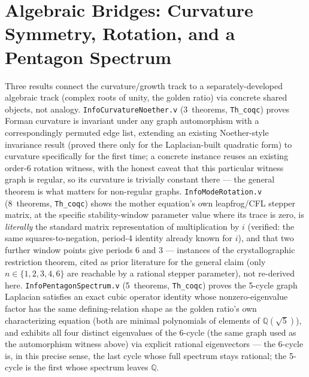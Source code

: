 \documentclass[10pt,twocolumn]{article}
\begin{document}
\section{Algebraic Bridges: Curvature Symmetry, Rotation, and a Pentagon Spectrum}
\label{sec:algebra}
Three results connect the curvature/growth track to a separately-developed
algebraic track (complex roots of unity, the golden ratio) via concrete
shared objects, not analogy. \texttt{InfoCurvatureNoether.v}
(3~theorems, \texttt{Th\_coqc}) proves Forman curvature is invariant under
any graph automorphism with a correspondingly permuted edge list, extending
an existing Noether-style invariance result (proved there only for the
Laplacian-built quadratic form) to curvature specifically for the first
time; a concrete instance reuses an existing order-6 rotation witness, with
the honest caveat that this particular witness graph is regular, so its
curvature is trivially constant there --- the general theorem is what
matters for non-regular graphs. \texttt{InfoModeRotation.v}
(8~theorems, \texttt{Th\_coqc}) shows the mother equation's own leapfrog/CFL
stepper matrix, at the specific stability-window parameter value where its
trace is zero, is \emph{literally} the standard matrix representation of
multiplication by $i$ (verified: the same squares-to-negation, period-4
identity already known for $i$), and that two further window points give
periods 6 and 3 --- instances of the crystallographic restriction theorem,
cited as prior literature for the general claim (only $n\in\{1,2,3,4,6\}$
are reachable by a rational stepper parameter), not re-derived here.
\texttt{InfoPentagonSpectrum.v} (5~theorems, \texttt{Th\_coqc}) proves the
5-cycle graph Laplacian satisfies an exact cubic operator identity whose
nonzero-eigenvalue factor has the same defining-relation shape as the golden
ratio's own characterizing equation (both are minimal polynomials of
elements of $\mathbb{Q}(\sqrt5)$), and exhibits all four distinct
eigenvalues of the 6-cycle (the same graph used as the automorphism witness
above) via explicit rational eigenvectors --- the 6-cycle is, in this
precise sense, the last cycle whose full spectrum stays rational; the
5-cycle is the first whose spectrum leaves $\mathbb{Q}$.
\end{document}
